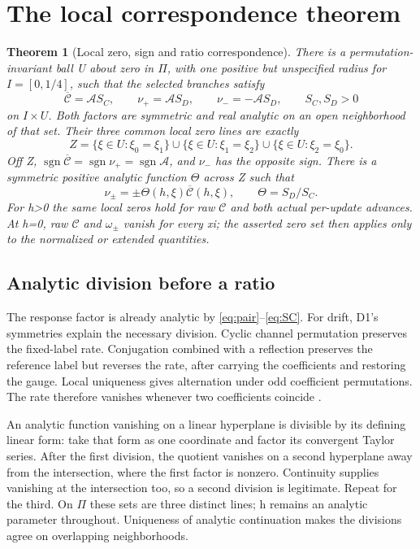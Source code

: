 \documentclass[11pt,a4paper]{article}
\numberwithin{equation}{section}
\newtheorem{theorem}{Theorem}[section]
\theoremstyle{remark}\newtheorem{remark}[theorem]{Remark}
\newcommand{\calA}{\mathcal A}\newcommand{\calC}{\mathcal C}\newcommand{\Cbar}{\overline{\mathcal C}}
\begin{document}
\clearpage
\section{The local correspondence theorem}\label{sec:theorem}
\begin{theorem}[Local zero, sign and ratio correspondence]\label{thm:correspondence}
There is a permutation-invariant ball U about zero in $\Pi$, with one positive but unspecified radius for $I=[0,1/4]$, such that the selected branches satisfy
\begin{equation}
\Cbar=\calA S_C,\qquad \nu_+=\calA S_D,
\qquad \nu_-=-\calA S_D,\qquad S_C,S_D>0
\label{eq:positive-factors}
\end{equation}
on $I\times U$. Both factors are symmetric and real analytic on an open neighborhood of that set. Their three common local zero lines are exactly
\begin{equation}
Z=\{\xi\in U:\xi_0=\xi_1\}\cup
\{\xi\in U:\xi_1=\xi_2\}\cup
\{\xi\in U:\xi_2=\xi_0\}.
\label{eq:zeros}
\end{equation}
Off Z, $\operatorname{sgn}\Cbar=\operatorname{sgn}\nu_+=\operatorname{sgn}\calA$, and $\nu_-$ has the opposite sign. There is a symmetric positive analytic function $\Theta$ across Z such that
\begin{equation}
\nu_\pm=\pm\Theta(h,\xi)\Cbar(h,\xi),
\qquad \Theta=S_D/S_C.
\label{eq:ratio}
\end{equation}
For h>0 the same local zeros hold for raw $\calC$ and both actual per-update advances. At h=0, raw $\calC$ and $\omega_\pm$ vanish for every xi; the asserted zero set then applies only to the normalized or extended quantities.
\end{theorem}

\subsection{Analytic division before a ratio}\label{sec:division}
The response factor is already analytic by \eqref{eq:pair}--\eqref{eq:SC}. For drift, D1's symmetries explain the necessary division. Cyclic channel permutation preserves the fixed-label rate. Conjugation combined with a reflection preserves the reference label but reverses the rate, after carrying the coefficients and restoring the gauge. Local uniqueness gives alternation under odd coefficient permutations. The rate therefore vanishes whenever two coefficients coincide \cite[D28--D29]{drift}.

An analytic function vanishing on a linear hyperplane is divisible by its defining linear form: take that form as one coordinate and factor its convergent Taylor series. After the first division, the quotient vanishes on a second hyperplane away from the intersection, where the first factor is nonzero. Continuity supplies vanishing at the intersection too, so a second division is legitimate. Repeat for the third. On $\Pi$ these sets are three distinct lines; h remains an analytic parameter throughout. Uniqueness of analytic continuation makes the divisions agree on overlapping neighborhoods.
\end{document}
